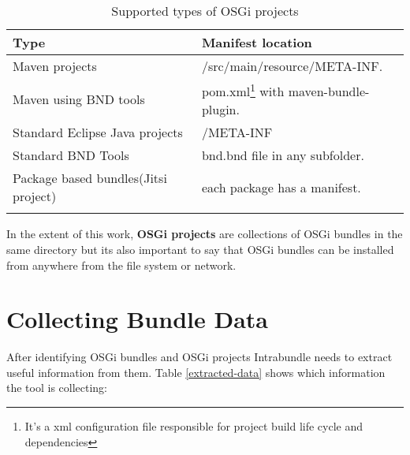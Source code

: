 \begin{table}[h]
\caption{Supported types of OSGi projects}
\label{osgi-project-type}
\begin{center}
    \begin{tabular}{  p{4cm} | p{6cm} }
    \Xhline{2\arrayrulewidth}
    Type & Manifest location \\  \hline
    Maven projects & /src/main/resource/META-INF.\\ \hline
    Maven using BND tools & pom.xml\footnote{It's a xml configuration file responsible for project build life cycle and dependencies} with maven-bundle-plugin.\\ \hline
    Standard Eclipse Java projects & /META-INF\\ \hline
    Standard BND Tools & bnd.bnd file in any subfolder.\\ \hline
    Package based bundles(Jitsi project) & each package has a manifest.\\  
   \Xhline{2\arrayrulewidth}

    \end{tabular}
\end{center}
\end{table}
\FloatBarrier

In the extent of this work, \textbf{OSGi projects} are collections of OSGi bundles in the same directory but its also important to say that OSGi bundles can be installed from anywhere from the file system or network.

\section{Collecting Bundle Data}
After identifying OSGi bundles and OSGi projects Intrabundle needs to extract useful information from them. Table \ref{extracted-data} shows which information the tool is collecting:

